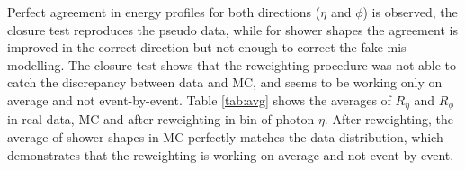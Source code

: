 Perfect agreement in energy profiles for both directions ($\eta$ and $\phi$) is observed, the closure test reproduces the pseudo data, while for shower shapes the agreement is improved in the correct direction but not enough to correct the fake mis-modelling. The closure test shows that the reweighting procedure was not able to catch the discrepancy between data and MC, and seems to be working only on average and not event-by-event. Table \ref{tab:avg} shows the averages of $R_{\eta}$ and $R_{\phi}$ in real data, MC and after reweighting in bin of photon $\eta$. After reweighting, the average of shower shapes in MC perfectly matches the data distribution, which demonstrates that the reweighting is working on average and not event-by-event.

